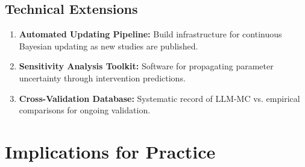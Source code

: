\documentclass[11pt,a4paper]{article}
\theoremstyle{definition}
\begin{document}
\subsection{Technical Extensions}

\begin{enumerate}
    \item \textbf{Automated Updating Pipeline:} Build infrastructure for 
    continuous Bayesian updating as new studies are published.
    
    \item \textbf{Sensitivity Analysis Toolkit:} Software for propagating 
    parameter uncertainty through intervention predictions.
    
    \item \textbf{Cross-Validation Database:} Systematic record of LLM-MC 
    vs. empirical comparisons for ongoing validation.
\end{enumerate}


\section{Implications for Practice}
\label{sec:bbb-implications}
\end{document}
